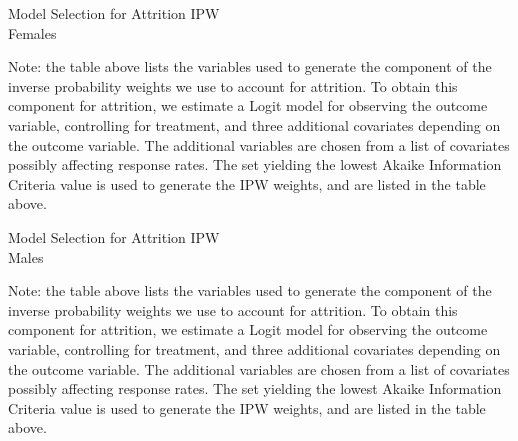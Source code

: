 \begin{table}
\caption{Model Selection for Attrition IPW \\ Females }
\label{table:ms_attrit_pooled}
\centering
\begin{adjustbox}{max width=\textwidth}
\begin{threeparttable}

\begin{tablenotes}
\tiny
\item Note: the table above lists the variables used to generate the component of the
inverse probability weights we use to account for attrition. To obtain this
component for attrition, we estimate a Logit model for observing the outcome variable,
controlling for treatment, and three additional covariates depending on the outcome
variable. The additional variables are chosen from a list of covariates possibly affecting
response rates. The set yielding the lowest Akaike Information Criteria value is used to
generate the IPW weights, and are listed in the table above.
\end{tablenotes}
\end{threeparttable}
\end{adjustbox}
\end{table}



\begin{table}
\caption{Model Selection for Attrition IPW \\ Males }
\label{table:ms_attrit_pooled}
\centering
\begin{adjustbox}{max width=\textwidth}
\begin{threeparttable}

\begin{tablenotes}
\tiny
\item Note: the table above lists the variables used to generate the component of the
inverse probability weights we use to account for attrition. To obtain this
component for attrition, we estimate a Logit model for observing the outcome variable,
controlling for treatment, and three additional covariates depending on the outcome
variable. The additional variables are chosen from a list of covariates possibly affecting
response rates. The set yielding the lowest Akaike Information Criteria value is used to
generate the IPW weights, and are listed in the table above.
\end{tablenotes}
\end{threeparttable}
\end{adjustbox}
\end{table}

